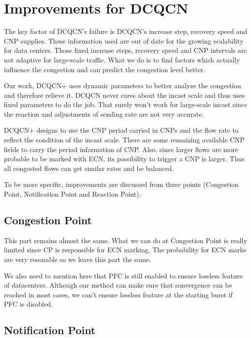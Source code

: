\documentclass[12pt,a4paper]{article}
\begin{document}
\section{Improvements for DCQCN}

The key factor of DCQCN's failure is DCQCN's increase step, recovery speed and CNP supplies.
These information used are out of date for the growing scalability for data centers.
Those fixed increase steps, recovery speed and CNP intervals are not adaptive for large-scale traffic.
What we do is to find factors which actually influence the congestion and can predict the congestion level better.

Our work, DCQCN+ uses dynamic parameters to better analyze the congestion and therefore relieve it.
DCQCN never cares about the incast scale and thus uses fixed parameters to do the job.
That surely won't work for large-scale incast since the reaction and adjustments of sending rate are not very accurate.

DCQCN+ designs to use the CNP period carried in CNPs and the flow rate to reflect the condition of the incast scale.
There are some remaining available CNP fields to carry the period information of CNP.
Also, since larger flows are more probable to be marked with ECN, its possibility to trigger a CNP is larger.
Thus all congested flows can get similar rates and be balanced.

To be more specific, improvements are discussed from three points (Congestion Point, Notification Point and Reaction Point).

\subsection{Congestion Point}

This part remains almost the same.
What we can do at Congestion Point is really limited since CP is responsible for ECN marking.
The probability for ECN marks are very resonable so we leave this part the same.

We also need to mention here that PFC is still enabled to ensure lossless feature of datacenters.
Although our method can make sure that convergence can be reached in most cases, we can't ensure lossless feature at the starting burst
if PFC is disabled.

\subsection{Notification Point}
\end{document}
